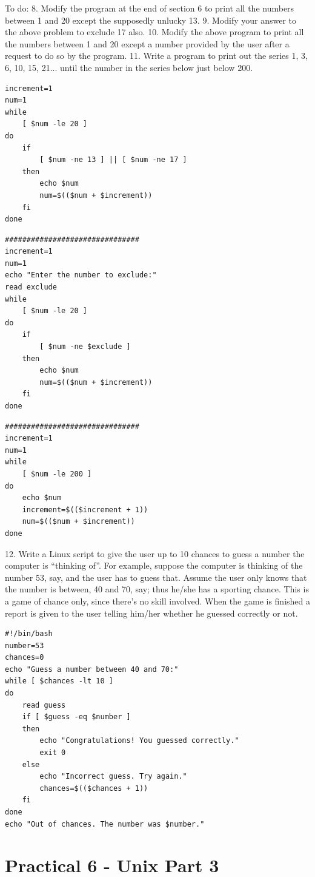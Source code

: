 \documentclass[a4paper]{article}
\begin{document}
\textcolor{green!50!black}
{
To do:
8. Modify the program at the end of section 6 to print all the
numbers between 1 and 20 except the supposedly
unlucky 13.
9. Modify your answer to the above problem to exclude 17
also.
10. Modify the above program to print all the numbers
between 1 and 20 except a number provided by the user
after a request to do so by the program.
11. Write a program to print out the series
1, 3, 6, 10, 15, 21...
until the number in the series below just below 200.
}
\begin{verbatim}
increment=1
num=1
while
    [ $num -le 20 ] 
do  
    if
        [ $num -ne 13 ] || [ $num -ne 17 ]
    then
        echo $num
        num=$(($num + $increment))
    fi
done    
\end{verbatim}
\begin{verbatim}
###############################
increment=1
num=1
echo "Enter the number to exclude:"
read exclude
while
    [ $num -le 20 ] 
do  
    if
        [ $num -ne $exclude ]
    then
        echo $num
        num=$(($num + $increment))
    fi
done    
\end{verbatim}
\begin{verbatim}
###############################
increment=1
num=1
while
    [ $num -le 200 ]    
do
    echo $num
    increment=$(($increment + 1))
    num=$(($num + $increment))
done
\end{verbatim}
\vspace{1em}

\noindent
\textcolor{green!50!black}
{
12. Write a Linux script to give the user up to 10 chances to guess a
number the computer is “thinking of”. For example, suppose the
computer is thinking of the number 53, say, and the user has to guess that.
Assume the user only knows that the number is between, 40 and 70, say;
thus he/she has a sporting chance.
This is a game of chance only, since there’s no skill involved. When the
game is finished a report is given to the user telling him/her whether he
guessed correctly or not.
}
\begin{verbatim}
#!/bin/bash
number=53
chances=0
echo "Guess a number between 40 and 70:"
while [ $chances -lt 10 ]
do
    read guess
    if [ $guess -eq $number ]
    then
        echo "Congratulations! You guessed correctly."
        exit 0
    else
        echo "Incorrect guess. Try again."
        chances=$(($chances + 1))
    fi
done
echo "Out of chances. The number was $number."
\end{verbatim}

\section{Practical 6 -  Unix Part 3}
\end{document}
